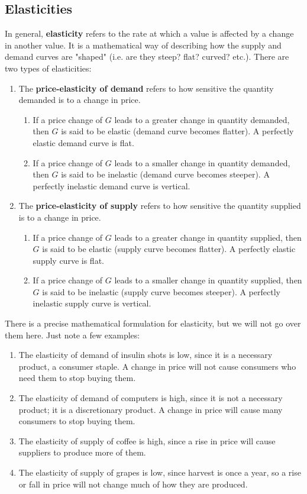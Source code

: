 \documentclass{article}
\begin{document}
  \subsection{Elasticities}

    In general, \textbf{elasticity} refers to the rate at which a value is affected by a change in another value. It is a mathematical way of describing how the supply and demand curves are "shaped" (i.e. are they steep? flat? curved? etc.). There are two types of elasticities:
    \begin{enumerate}
      \item The \textbf{price-elasticity of demand} refers to how sensitive the quantity demanded is to a change in price.
      \begin{enumerate}
        \item If a price change of $G$ leads to a greater change in quantity demanded, then $G$ is said to be elastic (demand curve becomes flatter). A perfectly elastic demand curve is flat.
        \item If a price change of $G$ leads to a smaller change in quantity demanded, then $G$ is said to be inelastic (demand curve becomes steeper). A perfectly inelastic demand curve is vertical.
      \end{enumerate}

      \item The \textbf{price-elasticity of supply} refers to how sensitive the quantity supplied is to a change in price.
      \begin{enumerate}
        \item If a price change of $G$ leads to a greater change in quantity supplied, then $G$ is said to be elastic (supply curve becomes flatter). A perfectly elastic supply curve is flat.
        \item If a price change of $G$ leads to a smaller change in quantity supplied, then $G$ is said to be inelastic (supply curve becomes steeper). A perfectly inelastic supply curve is vertical.
      \end{enumerate}

    \end{enumerate}
    There is a precise mathematical formulation for elasticity, but we will not go over them here. Just note a few examples:
    \begin{enumerate}
      \item The elasticity of demand of insulin shots is low, since it is a necessary product, a consumer staple. A change in price will not cause consumers who need them to stop buying them.
      \item The elasticity of demand of computers is high, since it is not a necessary product; it is a discretionary product. A change in price will cause many consumers to stop buying them.
      \item The elasticity of supply of coffee is high, since a rise in price will cause suppliers to produce more of them.
      \item The elasticity of supply of grapes is low, since harvest is once a year, so a rise or fall in price will not change much of how they are produced.
    \end{enumerate}
\end{document}
